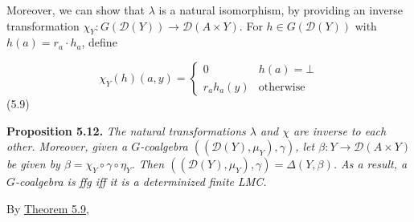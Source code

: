 \par\medskip
\hypertarget{html:S5.SS0.SSS0.Px2.p4}{} Moreover, we can show that %
\hypertarget{html:S5.SS0.SSS0.Px2.p4.m1}{}\({\lambda}\) is a natural isomorphism, by providing an inverse transformation %
\hypertarget{html:S5.SS0.SSS0.Px2.p4.m2}{}\({\chi_{Y}:G({\mathcal{D}}(Y))\to{\mathcal{D}}(A\times Y)}\). For %
\hypertarget{html:S5.SS0.SSS0.Px2.p4.m3}{}\({h\in G({\mathcal{D}}(Y))}\) with %
\hypertarget{html:S5.SS0.SSS0.Px2.p4.m4}{}\({h(a)=r_{a}\cdot h_{a}}\), define
\par\medskip
\hypertarget{html:S5.E9}{}   %
\hypertarget{html:S5.E9.m1}{}\[\chi_{Y}(h)(a,y)=\begin{cases}0&h(a)=\bot\\
r_{a}h_{a}(y)&\text{otherwise}\end{cases}\]  (5.9)    %
\hypertarget{html:S5.Thmtheorem12}{} \par\noindent\textbf{\textbf{Proposition 5.12}\textbf{.}}\quad  %
\hypertarget{html:S5.Thmtheorem12.p1}{} \emph{The natural transformations %
\hypertarget{html:S5.Thmtheorem12.p1.m1}{}\({\lambda}\) and %
\hypertarget{html:S5.Thmtheorem12.p1.m2}{}\({\chi}\) are inverse to each other. Moreover, given a %
\hypertarget{html:S5.Thmtheorem12.p1.m3}{}\({G}\)-coalgebra %
\hypertarget{html:S5.Thmtheorem12.p1.m4}{}\({(({\mathcal{D}}(Y),\mu_{Y}),\gamma)}\), let %
\hypertarget{html:S5.Thmtheorem12.p1.m5}{}\({\beta:Y\to{\mathcal{D}}(A\times Y)}\) be given by %
\hypertarget{html:S5.Thmtheorem12.p1.m6}{}\({\beta=\chi_{Y}\circ\gamma\circ\eta_{Y}}\). Then %
\hypertarget{html:S5.Thmtheorem12.p1.m7}{}\({(({\mathcal{D}}(Y),\mu_{Y}),\gamma)=\Delta(Y,\beta)}\). As a result, a %
\hypertarget{html:S5.Thmtheorem12.p1.m8}{}\({G}\)-coalgebra is ffg iff it is a determinized finite LMC.}
\par\medskip
\hypertarget{html:S5.SS0.SSS0.Px2.p5}{} By \hyperlink{html:S5.Thmtheorem9}{Theorem 5.9}, %
